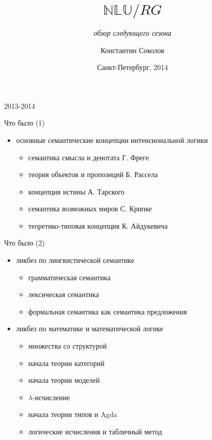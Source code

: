\documentclass{beamer}
\begin{document}
\title{\Large{$\mathbb{NLU}/RG$}}
\subtitle{\textit{обзор следующего сезона}}
\author{Константин Соколов}
\date{Санкт-Петербург, 2014} 
\begin{frame}
    \thispagestyle{empty}
    \titlepage
\end{frame}

\begin{frame}{}
\begin{center}
2013-2014
\end{center}
\end{frame}

\begin{frame}{Что было (1)}
\begin{small}
\begin{itemize}
    \item основные семантические концепции интенсиональной логики
    \begin{itemize}
        \item семантика смысла и денотата Г. Фреге
        \item теория объектов и пропозиций Б. Рассела
        \item концепция истины А. Тарского
        \item семантика возможных миров С. Крипке
        \item теоретико-типовая концепция К. Айдукевича    
    \end{itemize}
\end{itemize}
\end{small}
\end{frame}

\begin{frame}{Что было (2)}
\begin{small}
\begin{itemize}
    \item ликбез по лингвистической семантике
    \begin{itemize}
        \item грамматическая семантика
        \item лексическая семантика
        \item формальная семантика как семантика предложения
    \end{itemize}
    \item ликбез по математике и математической логике
    \begin{itemize}
        \item множества со структурой
        \item начала теории категорий
        \item начала теории моделей
        \item $\lambda$-исчисление
        \item начала теории типов и Agda
        \item логические исчисления и табличный метод
    \end{itemize}
\end{itemize}
\end{small}
\end{frame}
\end{document}
